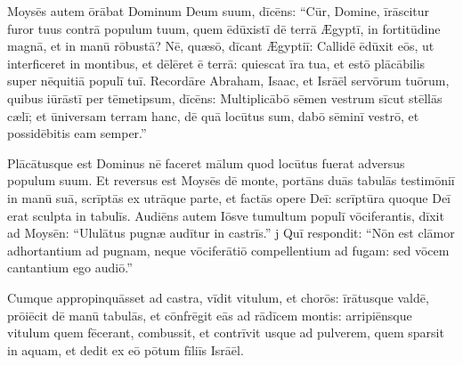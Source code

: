 Moysēs autem ōrābat Dominum Deum suum, dīcēns: ``Cūr, Domine, īrāscitur furor tuus contrā
populum tuum, quem ēdūxistī dē terrā Ægyptī, in fortitūdine magnā, et in manū
rōbustā? 
Nē, quæsō, dīcant Ægyptiī: 
Callidē ēdūxit eōs,
ut interficeret in montibus, et dēlēret ē terrā: quiescat īra tua, et estō
plācābilis
super nēquitiā populī tuī. 
Recordāre Abraham, Isaac, et
Isrāēl servōrum tuōrum, quibus iūrāstī per tēmetipsum,
dīcēns: Multiplicābō sēmen
vestrum sīcut stēllās cælī; et ūniversam terram hanc, dē quā locūtus sum,
dabō sēminī vestrō, et possidēbitis eam semper.''

Plācātusque est Dominus
nē faceret mālum quod locūtus fuerat adversus populum suum. 
Et reversus
est Moysēs dē monte, portāns duās tabulās testimōniī in manū suā, scrīptās ex utrāque parte, 
et factās opere Deī: scrīptūra quoque Deī erat sculpta in
tabulīs. 
Audiēns autem Iōsve tumultum populī vōciferantis, dīxit ad Moysēn: ``Ululātus pugnæ audītur in
castrīs.'' 
j
Quī respondit: ``Nōn est clāmor adhortantium ad
pugnam, neque vōciferātiō compellentium ad
fugam: sed vōcem cantantium ego audiō.''

Cumque appropinquāsset ad
castra, vīdit vitulum, et chorōs: īrātusque valdē, prōiēcit dē
manū tabulās, et cōnfrēgit eās ad
rādīcem montis: 
arripiēnsque vitulum quem fēcerant, combussit,
et contrīvit usque
ad pulverem, quem sparsit
in aquam, et dedit ex eō pōtum fīliīs Isrāēl. 

